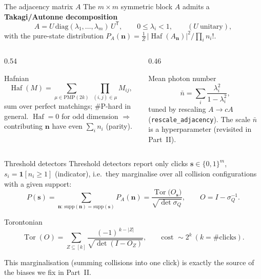 \documentclass[10pt,aspectratio=169]{beamer}
\newcommand{\Haf}{\operatorname{Haf}}
\newcommand{\Tor}{\operatorname{Tor}}
\newcommand{\nmean}{\bar n}
\newcommand{\vs}{\mathbf{s}}
\newcommand{\vn}{\mathbf{n}}
\begin{document}
\begin{frame}{The adjacency matrix $A$}
The $m\times m$ symmetric block $A$ admits a \textbf{Takagi/Autonne decomposition}
\[
A=U\,\mathrm{diag}(\lambda_1,\dots,\lambda_m)\,U^{\mathsf T},\qquad 0\le\lambda_i<1,
\qquad(U\ \text{unitary}),
\]
with the pure-state distribution $P_A(\vn)=\tfrac1Z\,|\Haf(A_{\vn})|^2/\prod_i n_i!$.
\begin{columns}
\begin{column}{0.54\textwidth}
\begin{block}{Hafnian}
\[
\Haf(M)=\!\!\sum_{\mu\in\mathrm{PMP}(2k)}\ \prod_{(i,j)\in\mu}\!M_{ij},
\]
sum over perfect matchings; \#P-hard in general. \alert{$\Haf=0$ for odd
dimension} $\Rightarrow$ contributing $\vn$ have even $\sum_i n_i$ (parity).
\end{block}
\end{column}
\begin{column}{0.46\textwidth}
\begin{block}{Mean photon number}
\[
\nmean=\sum_{i}\frac{\lambda_i^2}{1-\lambda_i^2},
\]
tuned by rescaling $A\to cA$ (\texttt{rescale\_adjacency}). The scale $\nmean$
is a hyperparameter (revisited in Part~II).
\end{block}
\end{column}
\end{columns}
\end{frame}

\begin{frame}{Threshold detectors}
Threshold detectors report only clicks $\vs\in\{0,1\}^m$,
$s_i=\mathbf 1[n_i\ge1]$ (indicator),
i.e.\ they marginalise over all collision configurations with a given support:
\[
P(\vs)=\!\!\sum_{\vn:\,\mathrm{supp}(\vn)=\mathrm{supp}(\vs)}\!\!P_A(\vn)
=\frac{\Tor\!\big(O_{\vs}\big)}{\sqrt{\det\sigma_Q}},\qquad O=I-\sigma_Q^{-1}.
\]
\begin{block}{Torontonian}
\[
\Tor(O)=\sum_{Z\subseteq[k]}\frac{(-1)^{\,k-|Z|}}{\sqrt{\det(I-O_Z)}},
\qquad \text{cost }\sim 2^{k}\ (k=\#\text{clicks}).
\]
\end{block}
This marginalisation (summing collisions into one click) is exactly the source
of the biases we fix in Part~II.
\end{frame}
\end{document}
